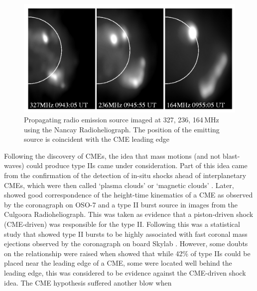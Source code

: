 \begin{figure}
\begin{center}
\includegraphics[scale=1.1, trim=0cm 0cm 0cm 0.5cm]{images/radio_shock.pdf}
\caption[Low frequency image of a radio shock]{Propagating radio emission source imaged at 327, 236, 164\,MHz using the Nancay Radioheliograph. The position of the emitting source is coincident with the CME leading edge \citep{maia2000}}
\label{fig:maia}
\end{center}
\end{figure}
Following the discovery of CMEs, the idea that mass motions (and not blast-waves) could produce type IIs came under consideration. Part of this idea came from the confirmation of the detection of in-situ shocks ahead of interplanetary CMEs, which were then called `plasma clouds' or `magnetic clouds' \citep{hundhausen1972}. Later, \citep{stewart1974} showed good correspondence of the height-time kinematics of a CME as observed by the coronagraph on OSO-7 and a type II burst source in images from the Culgoora Radioheliograph. This was taken as evidence that a piston-driven shock (CME-driven) was responsible for the type II. Following this was a statistical study that showed type II bursts to be highly associated with fast coronal mass ejections observed by the coronagraph on board Skylab \citep{gosling1976}. However, some doubts on the relationship were raised when \citep{robinson1985} showed that while 42\% of type IIs could be placed near the leading edge of a CME, some were located well behind the leading edge, this was considered to be evidence against the CME-driven shock idea. The CME hypothesis suffered another blow when
